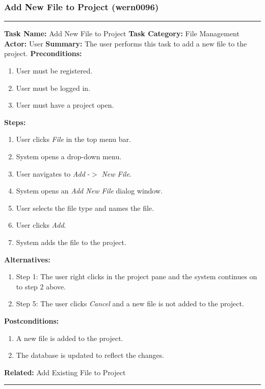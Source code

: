 \documentclass[11pt]{report}
\begin{document}
\subsubsection{Add New File to Project (wern0096)}
\vspace{2pt}
\hrule
\vspace{8pt}
	\noindent\textbf{Task Name:} Add New File to Project \newline
	\textbf{Task Category:} File Management \newline
	\textbf{Actor:} User \newline
	\textbf{Summary:} The user performs this task to add a new file to the project. \newline
	\textbf{Preconditions:}
	\begin{enumerate}
		\item User must be registered.
		\item User must be logged in.
		\item User must have a project open.
	\end{enumerate}
	\textbf{Steps:}
	\begin{enumerate}
		\item User clicks \textit{File} in the top menu bar.
		\item System opens a drop-down menu.
		\item User navigates to \textit{Add} -$>$ \textit{New File}.
		\item System opens an \textit{Add New File} dialog window.
		\item User selects the file type and names the file.
		\item User clicks \textit{Add}.
		\item System adds the file to the project.
	\end{enumerate}
	\textbf{Alternatives:}
	\begin{enumerate}
		\item Step 1: The user right clicks in the project pane and the system continues on to step 2 above.
		\item Step 5: The user clicks \textit{Cancel} and a new file is not added to the project.
	\end{enumerate}
	\textbf{Postconditions:}
	\begin{enumerate}
		\item A new file is added to the project.
		\item The database is updated to reflect the changes.
	\end{enumerate}
	\textbf{Related:} Add Existing File to Project
\vspace{8pt}
\hrule
\newpage
\end{document}
